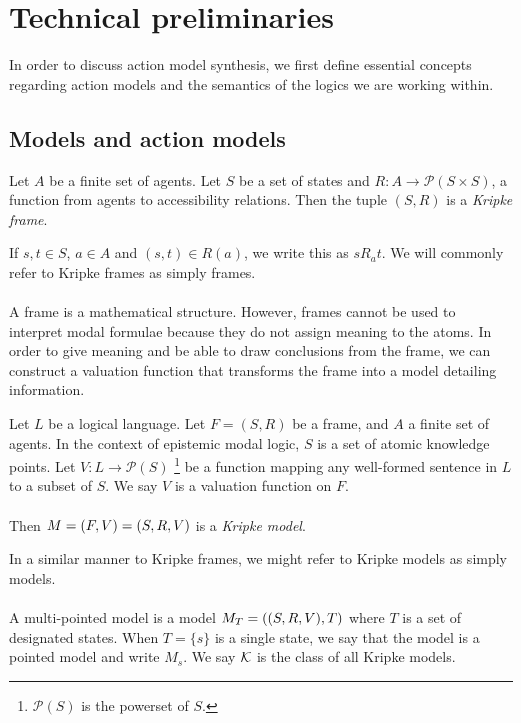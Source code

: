 \chapter{Technical preliminaries} \label{chapter:prelim}
In order to discuss action model synthesis, we first define essential concepts
regarding action
models and the semantics of the logics we are working within.

\section{Models and action models} \label{subsec:prelim:models}

\begin{defn} \label{frame}
	Let $A$ be a finite set of agents.
	Let $S$ be a set of states and $R: A \to \mathcal{P}(S \times S)$, a function from agents to
	accessibility relations.
	Then the tuple $(S, R)$ is a {\em Kripke frame}.
\end{defn}

If $s, t \in S$, $a \in A$ and $(s,t) \in R(a)$, we write this as $s R_a t$.
We will commonly refer to Kripke frames as simply frames.\\
\\
A frame is a mathematical structure.
However, frames cannot be used to interpret modal formulae because they do not assign meaning to the
atoms.
In order to give meaning and be able to draw conclusions from the frame, we can
construct a valuation function that transforms the frame into a model detailing
information.

\begin{defn} \label{model}
	Let $L$ be a logical language.
	Let $F = (S, R)$ be a frame, and $A$ a finite set of agents.
	In the context of epistemic modal logic, $S$ is a set of atomic knowledge points.
	Let $V: L \to \mathcal{P}(S)$ \footnote{$\mathcal{P}(S)$ is the powerset of $S$.} be a function mapping any
	well-formed	sentence in $L$ to a subset of $S$.
	We say $V$ is a valuation function on $F$.\\
	\\
	Then $M = (F, V) = (S, R, V)$ is a {\em Kripke model}.
\end{defn}

In a similar manner to Kripke frames, we might refer to Kripke models as simply models.\\
\\
A multi-pointed model is a model $M_T = ((S, R, V), T)$ where $T$ is a set of designated states.
When $T = \{s\}$ is a single state, we say that the model is a pointed model and write $M_s$.
We say $\mathcal{K}$ is the class of all Kripke models.

